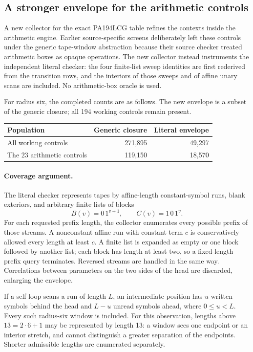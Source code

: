 \subsection{A stronger envelope for the arithmetic controls}
\label{sec:literal-contexts}

A new collector for the exact PA194LCG table refines the contexts inside
the arithmetic engine. Earlier source-specific screens deliberately left
these controls under the generic tape-window abstraction because their
source checker treated arithmetic boxes as opaque operations. The new
collector instead instruments the independent literal checker: the four
finite-list sweep identities are first rederived from the transition rows,
and the interiors of those sweeps and of affine unary scans are included.
No arithmetic-box oracle is used.

For radius six, the completed counts are as follows. The new envelope is
a subset of the generic closure; all 194 working controls remain present.
\begin{center}\small
\begin{tabular}{lrr}
\toprule
Population & Generic closure & Literal envelope\\
\midrule
All working controls & 271,895 & 49,297\\
The 23 arithmetic controls & 119,150 & 18,570\\
\bottomrule
\end{tabular}
\end{center}

\paragraph{Coverage argument.}
The literal checker represents tapes by affine-length constant-symbol
runs, blank exteriors, and arbitrary finite lists of blocks
\[
 B(v)=0\,1^{v+1},\qquad C(v)=1\,0\,1^v.
\]
For each requested prefix length, the collector enumerates every possible
prefix of those streams. A nonconstant affine run with constant term $c$
is conservatively allowed every length at least $c$. A finite list is
expanded as empty or one block followed by another list; each block has
length at least two, so a fixed-length prefix query terminates. Reversed
streams are handled in the same way. Correlations between parameters on
the two sides of the head are discarded, enlarging the envelope.

If a self-loop scans a run of length $L$, an intermediate position has
$u$ written symbols behind the head and $L-u$ unread symbols ahead,
where $0\le u<L$. Every such radius-six window is included. For this
observation, lengths above $13=2\cdot6+1$ may be represented by length 13:
a window sees one endpoint or an interior stretch, and cannot distinguish
a greater separation of the endpoints. Shorter admissible lengths are
enumerated separately.

